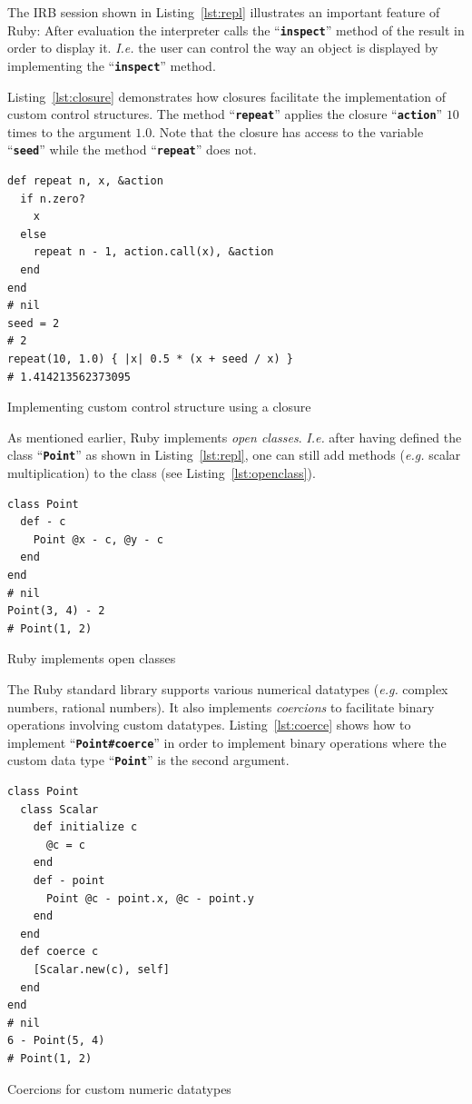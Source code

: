 \documentclass[10pt,journal,compsoc]{joser1}
\newcommand{\code}[1]{``\texttt{\textbf{\textcolor{codegray}{\small{#1}}}}''}
\newcommand{\lst}[1]{Listing~\ref{lst:#1}}
\begin{document}
The \ac{IRB} session shown in \lst{repl} illustrates an important feature of
Ruby: After evaluation the interpreter calls the \code{inspect} method of the
result in order to display it. \emph{I.e.} the user can control the way an
object is displayed by implementing the \code{inspect} method.

\lst{closure} demonstrates how closures facilitate the implementation of custom
control structures. The method \code{repeat} applies the closure \code{action}
$10$ times to the argument $1.0$. Note that the closure has access to
the variable \code{seed} while the method \code{repeat} does not.
\begin{listing}[htbp]
  \begin{verbatim}
def repeat n, x, &action
  if n.zero?
    x
  else
    repeat n - 1, action.call(x), &action
  end
end
# nil
seed = 2
# 2
repeat(10, 1.0) { |x| 0.5 * (x + seed / x) }
# 1.414213562373095
  \end{verbatim}
  \caption{Implementing custom control structure using a
  closure\label{lst:closure}}
\end{listing}

As mentioned earlier, Ruby implements \emph{open classes}. \emph{I.e.} after
having defined the class \code{Point} as shown in \lst{repl}, one can still add
methods (\emph{e.g.} scalar multiplication) to the class (see \lst{openclass}).
\begin{listing}[htbp]
  \begin{verbatim}
class Point
  def - c
    Point @x - c, @y - c
  end
end
# nil
Point(3, 4) - 2
# Point(1, 2)
  \end{verbatim}
  \caption{Ruby implements open classes\label{lst:openclass}}
\end{listing}

The Ruby standard library supports various numerical datatypes (\emph{e.g.}
complex numbers, rational numbers). It also implements \emph{coercions} to
facilitate binary operations involving custom datatypes. \lst{coerce} shows how
to implement \code{Point\#coerce} in order to implement binary operations where
the custom data type \code{Point} is the second argument.
\begin{listing}[htbp]
  \begin{verbatim}
class Point
  class Scalar
    def initialize c
      @c = c
    end
    def - point
      Point @c - point.x, @c - point.y
    end
  end
  def coerce c
    [Scalar.new(c), self]
  end
end
# nil
6 - Point(5, 4)
# Point(1, 2)
  \end{verbatim}
  \caption{Coercions for custom numeric datatypes\label{lst:coerce}}
\end{listing}
\end{document}
